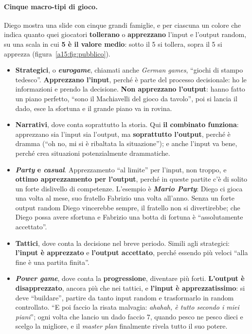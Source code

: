 \paragraph{Cinque macro-tipi di gioco.} Diego mostra una slide con cinque grandi famiglie,
e per ciascuna un colore che indica quanto quei giocatori \textbf{tollerano} o
\textbf{apprezzano} l'input e l'output random, su una scala in cui \textbf{5 è il valore
medio}: sotto il 5 si tollera, sopra il 5 si apprezza (figura~\ref{a15:fig:pubblico}).
\begin{itemize}
  \item \textbf{Strategici}, o \textbf{\emph{eurogame}}, chiamati anche \emph{German games},
        ``giochi di stampo tedesco''. \textbf{Apprezzano l'input}, perché è parte del processo
        decisionale: ho le informazioni e prendo la decisione. \textbf{Non apprezzano
        l'output}: hanno fatto un piano perfetto, ``sono il Machiavelli del gioco da
        tavolo'', poi si lancia il dado, esce la sfortuna e il grande piano va in rovina.
  \item \textbf{Narrativi}, dove conta soprattutto la storia. Qui \textbf{il combinato
        funziona}: apprezzano sia l'input sia l'output, ma \textbf{soprattutto l'output},
        perché è dramma (``oh no, mi si è ribaltata la situazione''); e anche l'input va bene,
        perché crea situazioni potenzialmente drammatiche.
  \item \textbf{\emph{Party} e \emph{casual}}. Apprezzamento ``al limite'' per l'input, non
        troppo, e \textbf{ottimo apprezzamento per l'output}, perché in queste partite c'è di
        solito un forte dislivello di competenze. L'esempio è \textbf{\emph{Mario Party}}:
        Diego ci gioca una volta al mese, suo fratello Fabrizio una volta all'anno. Senza un
        forte output random Diego vincerebbe sempre, il fratello non si divertirebbe; che Diego
        possa avere sfortuna e Fabrizio una botta di fortuna è ``assolutamente accettato''.
  \item \textbf{Tattici}, dove conta la decisione nel breve periodo. Simili agli strategici:
        \textbf{l'input è apprezzato} e \textbf{l'output accettato}, perché essendo più veloci
        ``alla fine è una partita finita''.
  \item \textbf{\emph{Power game}}, dove conta la \textbf{progressione}, diventare più forti.
        \textbf{L'output è disapprezzato}, ancora più che nei tattici, e \textbf{l'input è
        apprezzatissimo}: si deve ``buildare'', partire da tanto input random e trasformarlo in
        random controllato. ``E poi faccio la risata malvagia: \emph{ahahah, è tutto secondo i
        miei piani}''; ogni volta che lancio un dado faccio 7, quando pesco ne pesco dieci e
        scelgo la migliore, e il \emph{master plan} finalmente rivela tutto il suo potere.
\end{itemize}

